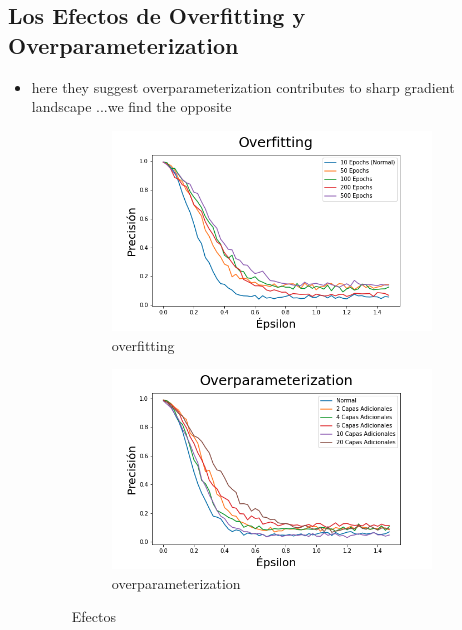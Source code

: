 \subsection{Los Efectos de Overfitting y Overparameterization}
\begin{itemize}
    \item here they suggest overparameterization contributes to sharp gradient landscape \cite{ma2020understanding}...we find the opposite
    \begin{figure}[h]
        \centering
        \begin{subfigure}[b]{0.49\textwidth}
            \centering
            \includegraphics[width=\textwidth]{images/overfit_vs_attack.png}
            \caption{overfitting}
            \label{overfit}
        \end{subfigure}
        \begin{subfigure}[b]{0.49\textwidth}
            \centering
            \includegraphics[width=\textwidth]{images/overparam_vs_attack.png}
            \caption{overparameterization}
            \label{overparam}
        \end{subfigure}
        \caption{Efectos}
        \label{overaparam_overfit}
    \end{figure}
    

\end{itemize}
